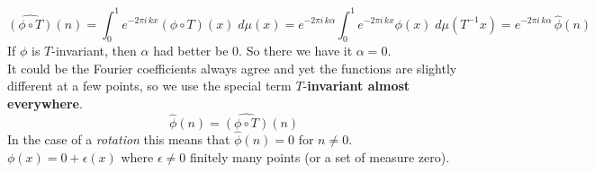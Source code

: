 \documentclass[12pt]{article}
\begin{document}
$$ \widehat{(\phi \circ T)}(n) =\int_0^1 e^{-2\pi i \, k x} (\phi \circ T)(x) \; d\mu(x)  = e^{-2\pi i \, k \alpha } \int_0^1 e^{-2\pi i \, k x} \phi (x) \; d\mu(T^{-1}x)
= e^{-2\pi i \, k \alpha } \,\widehat{\phi}(n) $$
If $\phi$ is $T$-invariant, then $\alpha$ had better be $0$.  So there we have it $\alpha = 0$. \\ 
It could be the Fourier coefficients always agree and yet the functions are slightly different at a few points, so we use the special term $T$-\textbf{invariant almost everywhere}.
$$ \widehat{\phi}(n) = \widehat{(\phi \circ T)}(n) $$
In the case of a \textit{rotation} this means that $\hat{\phi}(n) = 0$ for $n \neq 0$. $\phi(x) = 0 + \epsilon(x)$ where $\epsilon \neq 0$ finitely many points (or a set of measure zero).

\newpage 
\end{document}
